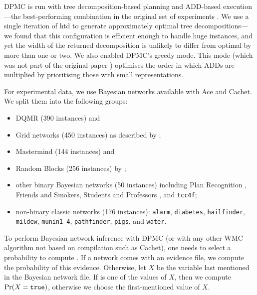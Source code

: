 \textsf{DPMC} is run with tree decomposition-based planning and ADD-based
execution---the best-performing combination in the original set of experiments
\citep{DBLP:conf/cp/DudekPV20}. We use a single iteration of \textsf{htd}
\citep{DBLP:conf/cpaior/AbseherMW17} to generate approximately optimal tree
decompositions---we found that this configuration is efficient enough to handle
huge instances, and yet the width of the returned decomposition is unlikely to
differ from optimal by more than one or two. We also enabled \textsf{DPMC}'s
greedy mode. This mode (which was not part of the original paper
\citep{DBLP:conf/cp/DudekPV20}) optimises the order in which ADDs are multiplied
by prioritising those with small representations.

For experimental data, we use Bayesian networks available with \textsf{Ace} and
\textsf{Cachet}. We split them into the following groups:
\begin{itemize}
\item DQMR (390 instances) and
\item Grid networks (450 instances) as described by \citet{DBLP:conf/aaai/SangBK05};
\item Mastermind (144 instances) and
\item Random Blocks (256 instances) by \citet{DBLP:journals/ijar/ChaviraDJ06};
\item other binary Bayesian networks (50 instances) including Plan Recognition
  \citep{DBLP:conf/aaai/SangBK05}, Friends and Smokers, Students and Professors
  \citep{DBLP:journals/ijar/ChaviraDJ06}, and \texttt{tcc4f};
\item non-binary classic networks (176 instances): \texttt{alarm},
  \texttt{diabetes}, \texttt{hailfinder}, \texttt{mildew},
  \texttt{munin1}--\texttt{4}, \texttt{pathfinder}, \texttt{pigs}, and
  \texttt{water}.
\end{itemize}

To perform Bayesian network inference with \textsf{DPMC} (or with any other WMC
algorithm not based on compilation such as \textsf{Cachet}), one needs to select
a probability to compute
\citep{DBLP:conf/cp/DudekPV20,DBLP:conf/sat/SangBBKP04}. If a network comes with
an evidence file, we compute the probability of this evidence. Otherwise, let
$X$ be the variable last mentioned in the Bayesian network file. If \true{} is
one of the values of $X$, then we compute $\Pr(X = \texttt{true}{})$, otherwise we
choose the first-mentioned value of $X$.

